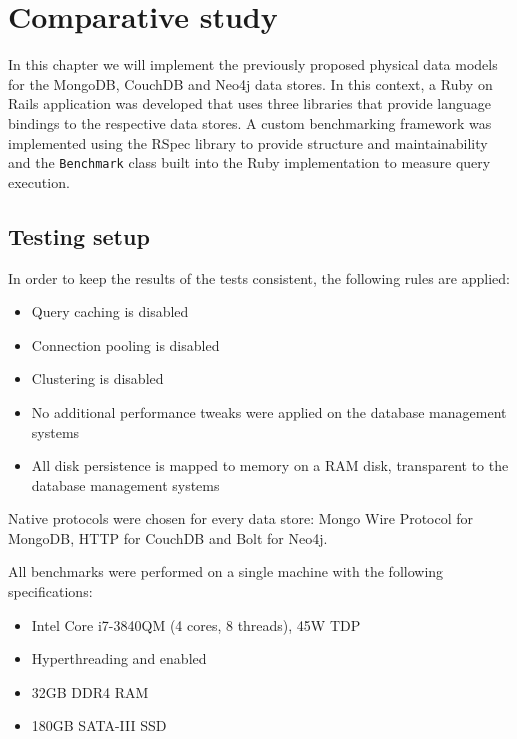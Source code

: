 \chapter{Comparative study}
\label{ch:comparative-study}

In this chapter we will implement the previously proposed physical data models for the MongoDB, CouchDB and Neo4j data stores.
In this context, a Ruby on Rails application was developed that uses three libraries that provide language bindings to the respective data stores.
A custom benchmarking framework was implemented using the RSpec library to provide structure and maintainability and the \texttt{Benchmark} class built into the Ruby implementation to measure query execution.

\section{Testing setup}
\label{sec:testing-setup}

In order to keep the results of the tests consistent, the following rules are applied:

\begin{itemize}
  \item Query caching is disabled
  \item Connection pooling is disabled
  \item Clustering is disabled
  \item No additional performance tweaks were applied on the database management systems
  \item All disk persistence is mapped to memory on a RAM disk, transparent to the database management systems
\end{itemize}

Native protocols were chosen for every data store: Mongo Wire Protocol for MongoDB, HTTP for CouchDB and Bolt for Neo4j.

All benchmarks were performed on a single machine with the following specifications:

\begin{itemize}
  \item Intel Core i7-3840QM (4 cores, 8 threads), 45W TDP
  \item Hyperthreading and  enabled
  \item 32GB DDR4 RAM
  \item 180GB SATA-III SSD
\end{itemize}

